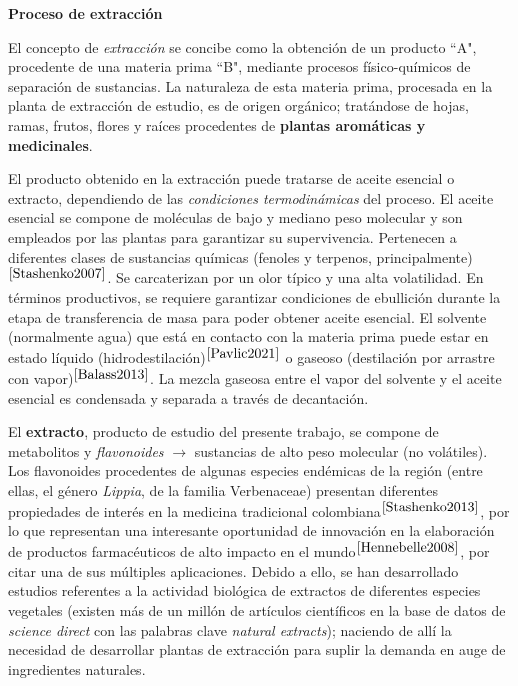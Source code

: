 \noindent
\justify

\textbf{\Large Proceso de extracci\'on}

\noindent
\justify

El concepto de \textit{extracci\'on} se concibe como la obtenci\'on de un producto ``A", procedente de una materia prima ``B", mediante procesos f\'isico-qu\'imicos de separaci\'on de sustancias. La naturaleza de esta materia prima, procesada en la planta de extracci\'on de estudio, es de origen org\'anico; trat\'andose de hojas, ramas, frutos, flores y ra\'ices procedentes de \textbf{plantas arom\'aticas y medicinales}.



\newpage

\noindent
\justify

El producto obtenido en la extracci\'on puede tratarse de aceite esencial o extracto, dependiendo de las \textit{condiciones termodin\'amicas} del proceso. El aceite esencial se compone de mol\'eculas de bajo y mediano peso molecular y son empleados por las plantas para garantizar su supervivencia. Pertenecen a diferentes clases de sustancias qu\'imicas (fenoles y terpenos, principalmente)$^{\cite{Stashenko2007}}$. Se carcaterizan por un olor t\'ipico y una alta volatilidad. En t\'erminos productivos, se requiere garantizar condiciones de ebullici\'on durante la etapa de transferencia de masa para poder obtener aceite esencial. El solvente (normalmente agua) que est\'a en contacto con la materia prima puede estar en estado l\'iquido (hidrodestilaci\'on)$^{\cite{Pavlic2021}}$ o gaseoso (destilaci\'on por arrastre con vapor)$^{\cite{Balass2013}}$. La mezcla gaseosa entre el vapor del solvente y el aceite esencial es condensada y separada a trav\'es de decantaci\'on.

\noindent
\justify

El \textbf{extracto}, producto de estudio del presente trabajo, se compone de metabolitos y \textit{flavonoides} $\rightarrow$ sustancias de alto peso molecular (no vol\'atiles). Los flavonoides procedentes de algunas especies end\'emicas de la regi\'on (entre ellas, el g\'enero \textit{Lippia}, de la familia Verbenaceae) presentan diferentes propiedades de inter\'es en la medicina tradicional colombiana$^{\cite{Stashenko2013}}$, por lo que representan una interesante oportunidad de innovaci\'on en la elaboraci\'on de productos farmac\'euticos de alto impacto en el mundo$^{\cite{Hennebelle2008}}$, por citar una de sus m\'ultiples aplicaciones. Debido a ello, se han desarrollado estudios referentes a la actividad biol\'ogica de extractos de diferentes especies vegetales (existen m\'as de un mill\'on de art\'iculos cient\'ificos en la base de datos de \textit{science direct} con las palabras clave \textit{natural extracts}); naciendo de all\'i la necesidad de desarrollar plantas de extracci\'on para suplir la demanda en auge de ingredientes naturales. 

